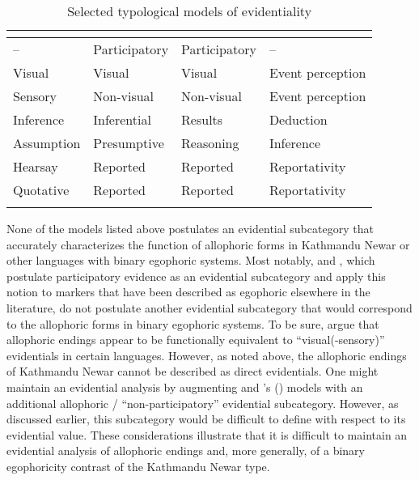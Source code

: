 \documentclass[output=paper]{langsci/langscibook}
\begin{document}
\begin{table}
\begin{tabularx}{\textwidth}{p{2.5cm}p{2.3cm}QQ}
\lsptoprule
\textbf{\cite{Aikhenvald2004}}	&	\textbf{\cite{Plungian2010}}	&	\textbf{\cite{SanRoqueLoughnane2012}}	&	\textbf{\cite{Hengeveld2015}}\\
\midrule
–	&	Participatory	&	Participatory	&	–	\\
\hline 
Visual	&	Visual	&	Visual	&	Event perception	\\
\hline 
Sensory	&	Non-visual	&	Non-visual	&	Event perception	\\
\hline
Inference	&	Inferential	&	Results	&	Deduction	\\
\hline
Assumption	&	Presumptive	&	Reasoning	&	Inference	\\
\hline
Hearsay	&	Reported	&	Reported	&	Reportativity	\\
\hline
Quotative	&	Reported	&	Reported	&	Reportativity	\\
\lspbottomrule
\end{tabularx}
\caption{Selected typological models of evidentiality}
\label{tab:mw6}
\end{table}

None of the models listed above postulates an evidential subcategory that accurately characterizes the function of allophoric forms in Kathmandu Newar or other languages with binary egophoric systems. Most notably, \cite{Plungian2010} and \cite{SanRoqueLoughnane2012}, which postulate participatory evidence as an evidential subcategory and apply this notion to markers that have been described as egophoric elsewhere in the literature, do not postulate another evidential subcategory that would correspond to the allophoric forms in binary egophoric systems. To be sure, \cite[158]{SanRoqueLoughnane2012} argue that allophoric endings appear to be functionally equivalent to “visual(-sensory)” evidentials in certain languages. However, as noted above, the allophoric endings of Kathmandu Newar cannot be described as direct evidentials. One might maintain an evidential analysis by augmenting \cite{Plungian2010} and \citeauthor{SanRoqueLoughnane2012}’s (\citeyear{SanRoqueLoughnane2012}) models with an additional allophoric / “non-participatory” evidential subcategory. However, as discussed earlier, this subcategory would be difficult to define with respect to its evidential value. These considerations illustrate that it is difficult to maintain an evidential analysis of allophoric endings and, more generally, of a binary egophoricity contrast of the Kathmandu Newar type.
\end{document}
